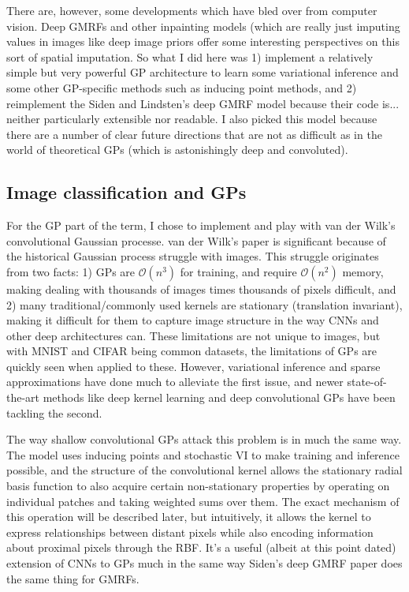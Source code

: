 \documentclass{article}
\begin{document}
There are, however, some developments which have bled over from computer vision.
Deep GMRFs\cite{deepgmrf} and other inpainting models (which are really just
imputing values in images like deep image priors\cite{dip} offer some interesting
perspectives on this sort of spatial imputation.
So what I did here was 1) implement a relatively simple but very powerful GP
architecture to learn some variational inference and some other GP-specific
methods such as inducing point methods, and 2) reimplement the Siden and Lindsten's deep GMRF model
because their code is... neither particularly extensible nor readable. I also picked
this model because there are a number of clear future directions that are not as
difficult as in the world of theoretical GPs (which is astonishingly deep
and convoluted).

\subsection{Image classification and GPs}
For the GP part of the term, I chose to implement and play with van der Wilk's
convolutional Gaussian processe.
van der Wilk's paper is significant because of the historical Gaussian process
struggle with images. This struggle originates from two facts: 1) GPs are $\mathcal{O}
(n^3)$ for training, and require $\mathcal{O}(n^2)$ memory, making dealing with
thousands of images times thousands of pixels difficult, and 2) many
traditional/commonly used kernels are stationary (translation invariant), making it difficult
for them to capture image structure in the way CNNs and other deep architectures
can. These limitations are not unique to images, but with MNIST and CIFAR being
common datasets, the limitations of GPs are quickly seen when applied to these.
However, variational inference and sparse approximations have done much to alleviate the first issue, and newer
state-of-the-art methods like deep kernel learning \cite{wilson} and deep convolutional
GPs \cite{deepconv} have been tackling the second.

The way shallow convolutional GPs attack this problem is in much the same way. The
model uses inducing points and stochastic VI to make training and inference possible,
and the structure of the convolutional kernel allows the stationary radial basis
function to also acquire certain non-stationary properties by operating on individual
patches and taking weighted sums over them. The exact mechanism of this operation
will be described later, but intuitively, it allows the kernel to express relationships
between distant pixels while also encoding information about proximal pixels
through the RBF. It's a useful (albeit at this point dated) extension of CNNs to GPs
much in the same way Siden's deep GMRF paper does the same thing for GMRFs.
\end{document}
